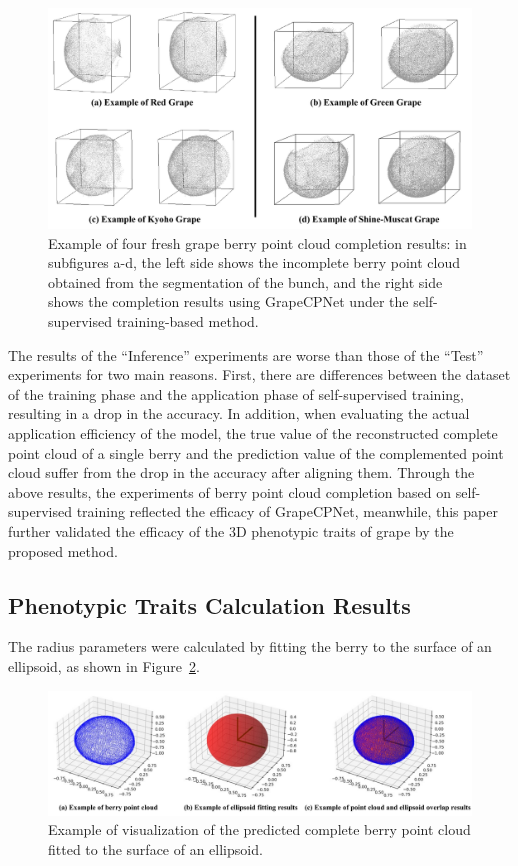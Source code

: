 \documentclass[12pt]{article}
\begin{document}
\begin{figure}[hbt!]
    \centering
    \includegraphics[width=1\textwidth]{figures/Figure12.pdf}
    \caption{Example of four fresh grape berry point cloud completion results: in subfigures a-d, the left side shows the incomplete berry point cloud obtained from the segmentation of the bunch, and the right side shows the completion results using GrapeCPNet under the self-supervised training-based method.}
    \label{fig:raw14}
\end{figure}

The results of the ``Inference'' experiments are worse than those of the ``Test'' experiments for two main reasons.
First, there are differences between the dataset of the training phase and the application phase of self-supervised training, resulting in a drop in the accuracy. 
In addition, when evaluating the actual application efficiency of the model, the true value of the reconstructed complete point cloud of a single berry and the prediction value of the complemented point cloud suffer from the drop in the accuracy after aligning them. 
Through the above results, the experiments of berry point cloud completion based on self-supervised training reflected the efficacy of GrapeCPNet, meanwhile, this paper further validated the efficacy of the 3D phenotypic traits of grape by the proposed method.

\subsection{Phenotypic Traits Calculation Results}

The radius parameters were calculated by fitting the berry to the surface of an ellipsoid, as shown in Figure~\ref{fig:raw16}.

\begin{figure}[hbt!]
    \centering
    \includegraphics[width=1\textwidth]{figures/Figure13.pdf}
    \caption{Example of visualization of the predicted complete berry point cloud fitted to the surface of an ellipsoid.}
    \label{fig:raw16}
\end{figure}
\end{document}

